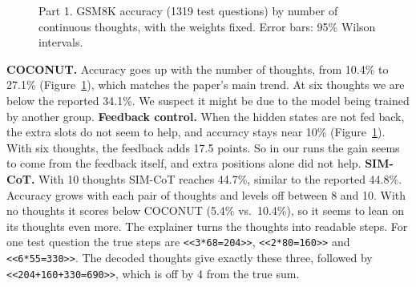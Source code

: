\documentclass[10pt,letterpaper]{article}
\newcommand{\step}[1]{\texttt{\small #1}}
\begin{document}
\begin{figure}[t]
\centering
{}
\caption{Part 1. GSM8K accuracy (1319 test questions) by number of continuous thoughts, with the weights fixed.
Error bars: 95\% Wilson intervals.}
\label{fig:part1}
\end{figure}

\textbf{COCONUT.} Accuracy goes up with the number of thoughts, from 10.4\% to 27.1\% (Figure~\ref{fig:part1}),
which matches the paper's main trend. At six thoughts we are below the reported 34.1\%. We suspect it might be due to the model being trained by another group.
\newline \noindent
\textbf{Feedback control.} When the hidden states are not fed back, the extra slots do not seem to help, and accuracy stays near 10\% (Figure~\ref{fig:part1}). With six thoughts, the feedback adds 17.5 points. So in our runs the gain
seems to come from the feedback itself, and extra positions alone did not help.
\newline \noindent
\textbf{SIM-CoT.} With 10 thoughts SIM-CoT reaches 44.7\%, similar to the reported 44.8\%. Accuracy grows
with each pair of thoughts and levels off between 8 and 10. With no thoughts it scores below COCONUT (5.4\% vs.\
10.4\%), so it seems to lean on its thoughts even more. The explainer turns the thoughts into readable steps. For one
test question the true steps are \step{<<3*68=204>>}, \step{<<2*80=160>>} and \step{<<6*55=330>>}. The decoded
thoughts give exactly these three, followed by \step{<<204+160+330=690>>}, which is off by 4 from the true sum.
\end{document}
